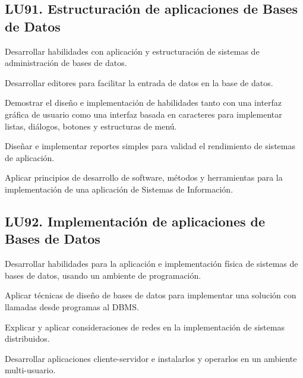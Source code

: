 \subsection{LU91. Estructuración de aplicaciones de Bases de Datos}\label{sec:LU91}
\begin{LearningUnit}
\begin{LUGoal}
\item Desarrollar habilidades con aplicación y estructuración de sistemas de administración de  bases de datos.
\end{LUGoal}

\begin{LUObjective}
\item Desarrollar editores para facilitar la entrada de datos en la base de datos.
\item Demostrar el diseño e implementación de habilidades tanto con una interfaz gráfica de usuario como una interfaz basada en caracteres para implementar listas, diálogos, botones y estructuras de menú.
\item Diseñar e implementar reportes simples para validad el rendimiento de sistemas de aplicación.
\item Aplicar principios de desarrollo de software, métodos y herramientas para la implementación de una aplicación de Sistemas de Información.
\end{LUObjective}
\end{LearningUnit}

\subsection{LU92. Implementación de aplicaciones de Bases de Datos}\label{sec:LU92}
\begin{LearningUnit}
\begin{LUGoal}
\item Desarrollar habilidades para la aplicación e implementación física de sistemas de bases de datos, usando un ambiente de programación.
\end{LUGoal}

\begin{LUObjective}
\item Aplicar técnicas de diseño de bases de datos para implementar una solución con llamadas desde programas al DBMS.
\item Explicar y aplicar consideraciones de redes en la implementación de sistemas distribuidos.
\item Desarrollar aplicaciones cliente-servidor e instalarlos y operarlos en un ambiente multi-usuario.
\end{LUObjective}
\end{LearningUnit}

